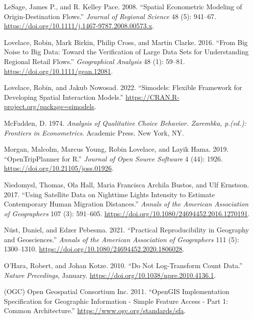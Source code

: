 \documentclass[11pt,letterpaper]{article}
\newlength{\cslhangindent}
\newlength{\cslentryspacingunit} %
\newenvironment{CSLReferences}[2] %
 {%
  \setlength{\parindent}{0pt}
  \ifodd #1
  \let\oldpar\par
  \def\par{\hangindent=\cslhangindent\oldpar}
  \fi
  \setlength{\parskip}{#2\cslentryspacingunit}
 }%
 {}
\begin{document}
\begin{CSLReferences}{1}{0}
\leavevmode{}%
LeSage, James P., and R. Kelley Pace. 2008. {``Spatial Econometric Modeling of Origin-Destination Flows.''} \emph{Journal of Regional Science} 48 (5): 941--67. \url{https://doi.org/10.1111/j.1467-9787.2008.00573.x}.

\leavevmode{}%
Lovelace, Robin, Mark Birkin, Philip Cross, and Martin Clarke. 2016. {``From Big Noise to Big Data: Toward the Verification of Large Data Sets for Understanding Regional Retail Flows.''} \emph{Geographical Analysis} 48 (1): 59--81. \url{https://doi.org/10.1111/gean.12081}.

\leavevmode{}%
Lovelace, Robin, and Jakub Nowosad. 2022. {``Simodels: Flexible Framework for Developing Spatial Interaction Models.''} \url{https://CRAN.R-project.org/package=simodels}.

\leavevmode{}%
McFadden, D. 1974. \emph{Analysis of Qualitative Choice Behavior. Zarembka, p.(ed.): Frontiers in Econometrics}. Academic Press. New York, NY.

\leavevmode{}%
Morgan, Malcolm, Marcus Young, Robin Lovelace, and Layik Hama. 2019. {``OpenTripPlanner for R.''} \emph{Journal of Open Source Software} 4 (44): 1926. \url{https://doi.org/10.21105/joss.01926}.

\leavevmode{}%
Niedomysl, Thomas, Ola Hall, Maria Francisca Archila Bustos, and Ulf Ernstson. 2017. {``Using Satellite Data on Nighttime Lights Intensity to Estimate Contemporary Human Migration Distances.''} \emph{Annals of the American Association of Geographers} 107 (3): 591--605. \url{https://doi.org/10.1080/24694452.2016.1270191}.

\leavevmode{}%
Nüst, Daniel, and Edzer Pebesma. 2021. {``Practical Reproducibility in Geography and Geosciences.''} \emph{Annals of the American Association of Geographers} 111 (5): 1300--1310. \url{https://doi.org/10.1080/24694452.2020.1806028}.

\leavevmode{}%
O'Hara, Robert, and Johan Kotze. 2010. {``Do Not Log-Transform Count Data.''} \emph{Nature Precedings}, January. \url{https://doi.org/10.1038/npre.2010.4136.1}.

\leavevmode{}%
(OGC) Open Geospatial Consortium Inc. 2011. {``OpenGIS Implementation Specification for Geographic Information - Simple Feature Access - Part 1: Common Architecture.''} \url{https://www.ogc.org/standards/sfa}.


\end{CSLReferences}
\end{document}
